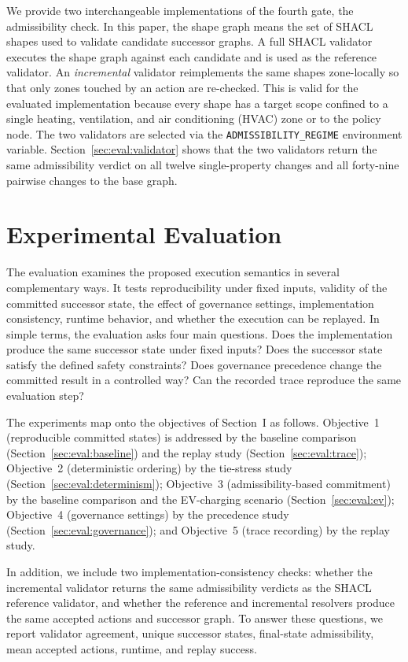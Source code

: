 \documentclass{ieeeaccess}
\theoremstyle{definition}
\theoremstyle{plain}
\theoremstyle{remark}
\begin{document}
We provide two interchangeable implementations of the fourth gate, the admissibility check. In this paper, the shape graph means the set of SHACL shapes used to validate candidate successor graphs. A full SHACL validator executes the shape graph against each candidate and is used as the reference validator. An \emph{incremental} validator reimplements the same shapes zone-locally so that only zones touched by an action are re-checked. This is valid for the evaluated implementation because every shape has a target scope confined to a single heating, ventilation, and air conditioning (HVAC) zone or to the policy node. The two validators are selected via the \texttt{ADMISSIBILITY\_REGIME} environment variable. Section~\ref{sec:eval:validator} shows that the two validators return the same admissibility verdict on all twelve single-property changes and all forty-nine pairwise changes to the base graph.

\section{Experimental Evaluation}
\label{sec:evaluation}

The evaluation examines the proposed execution semantics in several complementary ways. It tests reproducibility under fixed inputs, validity of the committed successor state, the effect of governance settings, implementation consistency, runtime behavior, and whether the execution can be replayed. In simple terms, the evaluation asks four main questions. Does the implementation produce the same successor state under fixed inputs? Does the successor state satisfy the defined safety constraints? Does governance precedence change the committed result in a controlled way? Can the recorded trace reproduce the same evaluation step?

The experiments map onto the objectives of Section~I as follows. Objective~1 (reproducible committed states) is addressed by the baseline comparison (Section~\ref{sec:eval:baseline}) and the replay study (Section~\ref{sec:eval:trace}); Objective~2 (deterministic ordering) by the tie-stress study (Section~\ref{sec:eval:determinism}); Objective~3 (admissibility-based commitment) by the baseline comparison and the EV-charging scenario (Section~\ref{sec:eval:ev}); Objective~4 (governance settings) by the precedence study (Section~\ref{sec:eval:governance}); and Objective~5 (trace recording) by the replay study.

In addition, we include two implementation-consistency checks: whether the incremental validator returns the same admissibility verdicts as the SHACL reference validator, and whether the reference and incremental resolvers produce the same accepted actions and successor graph. To answer these questions, we report validator agreement, unique successor states, final-state admissibility, mean accepted actions, runtime, and replay success.
\end{document}
